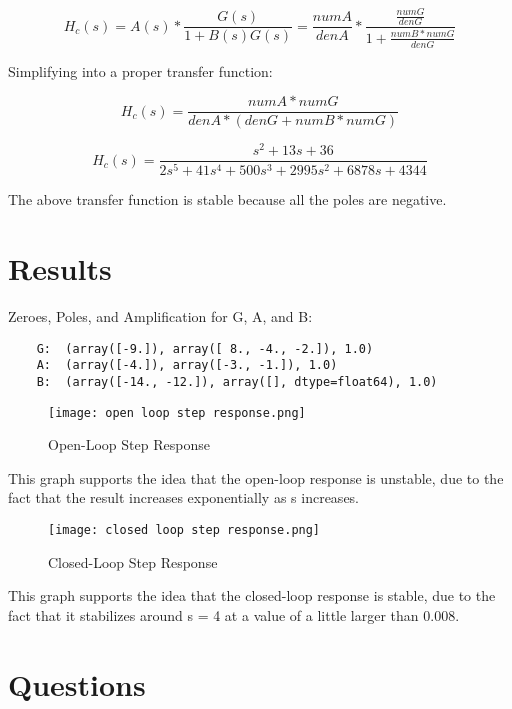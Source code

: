 \documentclass[12pt]{article}
\begin{document}
\begin{equation}
    H_c(s) = A(s) * \frac{G(s)}{1 + B(s)G(s)} = \frac{numA}{denA} * \frac{\frac{numG}{denG}}{1+\frac{numB*numG}{denG}}
\end{equation}

Simplifying into a proper transfer function:

\begin{equation}
    H_c(s) = \frac{numA * numG}{denA * (denG + numB * numG)}
\end{equation}

\begin{equation}
    H_c(s) = \frac{s^2+13s+36}{2s^5+41s^4+500s^3+2995s^2+6878s+4344}
\end{equation}

The above transfer function is stable because all the poles are negative.

\section{Results}

Zeroes, Poles, and Amplification for G, A, and B:

\begin{lstlisting}
    G:  (array([-9.]), array([ 8., -4., -2.]), 1.0)
    A:  (array([-4.]), array([-3., -1.]), 1.0)
    B:  (array([-14., -12.]), array([], dtype=float64), 1.0)
\end{lstlisting}

\begin{figure}[h!]
    \centering
    \texttt{[image: open loop step response.png]}
    \caption{Open-Loop Step Response}
\end{figure}

This graph supports the idea that the open-loop response is unstable, due to the fact that the result increases exponentially as s increases.

\begin{figure}[h!]
    \centering
    \texttt{[image: closed loop step response.png]}
    \caption{Closed-Loop Step Response}
\end{figure}

This graph supports the idea that the closed-loop response is stable, due to the fact that it stabilizes around s = 4 at a value of a little larger than 0.008.

\newpage

\section{Questions}
\end{document}
